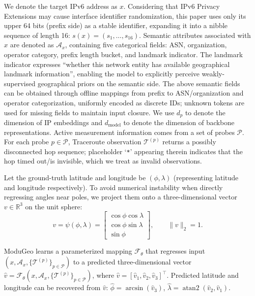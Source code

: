 \documentclass[runningheads]{llncs}
\begin{document}
We denote the target IPv6 address as $x$. Considering that IPv6 Privacy Extensions may cause interface identifier randomization, this paper uses only its upper 64 bits (prefix side) as a stable identifier, expanding it into a nibble sequence of length 16: $s(x)=(s_1,\dots,s_{16})$. Semantic attributes associated with $x$ are denoted as $\mathcal{A}_x$, containing five categorical fields: ASN, organization, operator category, prefix length bucket, and landmark indicator. The landmark indicator expresses ``whether this network entity has available geographical landmark information'', enabling the model to explicitly perceive weakly-supervised geographical priors on the semantic side. The above semantic fields can be obtained through offline mappings from prefix to ASN/organization and operator categorization, uniformly encoded as discrete IDs; unknown tokens are used for missing fields to maintain input closure. We use $d_p$ to denote the dimension of IP embeddings and $d_{\text{model}}$ to denote the dimension of backbone representations. Active measurement information comes from a set of probes $\mathcal{P}$. For each probe $p\in\mathcal{P}$, Traceroute observation $\mathcal{T}^{(p)}$ returns a possibly disconnected hop sequence; placeholder `\verb|*|' appearing therein indicates that the hop timed out/is invisible, which we treat as invalid observations.

Let the ground-truth latitude and longitude be $(\phi,\lambda)$ (representing latitude and longitude respectively). To avoid numerical instability when directly regressing angles near poles, we project them onto a three-dimensional vector $v\in\mathbb{R}^3$ on the unit sphere:
\begin{equation}
v = \psi(\phi,\lambda) =
\begin{bmatrix}
\cos\phi\cos\lambda \\
\cos\phi\sin\lambda \\
\sin\phi
\end{bmatrix},
\qquad \|v\|_2=1.
\label{eq:sphere_projection}
\end{equation}

ModuGeo learns a parameterized mapping $\mathcal{F}_\theta$ that regresses input $(x,\mathcal{A}_x,\{\mathcal{T}^{(p)}\}_{p\in\mathcal{P}})$ to a predicted three-dimensional vector $\hat{v}=\mathcal{F}_\theta(x,\mathcal{A}_x,\{\mathcal{T}^{(p)}\}_{p\in\mathcal{P}})$, where $\hat{v}=[\hat{v}_1,\hat{v}_2,\hat{v}_3]^\top$. Predicted latitude and longitude can be recovered from $\hat{v}$: $\hat{\phi}=\arcsin(\hat{v}_3)$, $\hat{\lambda}=\operatorname{atan2}(\hat{v}_2,\hat{v}_1)$.
\end{document}
